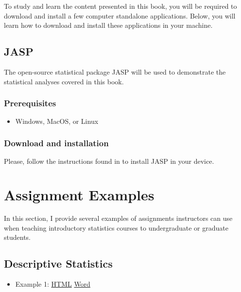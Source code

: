 \documentclass[
]{book}
\providecommand{\tightlist}{%
  \setlength{\itemsep}{0pt}\setlength{\parskip}{0pt}}
\begin{document}
To study and learn the content presented in this book, you will be required to download and install a few computer standalone applications. Below, you will learn how to download and install these applications in your machine.

\hypertarget{jasp}{%
\section{JASP}\label{jasp}}

The open-source statistical package JASP \citep{JASP2020} will be used to demonstrate the statistical analyses covered in this book.

\hypertarget{prerequisites}{%
\subsection{Prerequisites}\label{prerequisites}}

\begin{itemize}
\tightlist
\item
  Windows, MacOS, or Linux
\end{itemize}

\hypertarget{jasp-install}{%
\subsection{Download and installation}\label{jasp-install}}

Please, follow the instructions found in \citep{goss-sampsonStatisticalAnalysisJASP2020} to install JASP in your device.

\hypertarget{assignment-examples}{%
\chapter{Assignment Examples}\label{assignment-examples}}

In this section, I provide several examples of assignments instructors can use when teaching introductory statistics courses to undergraduate or graduate students.

\hypertarget{descriptive-statistics}{%
\section{Descriptive Statistics}\label{descriptive-statistics}}

\begin{itemize}
\tightlist
\item
  Example 1: \href{assignments/homework-example-01.html}{HTML} \textbar{} \href{assignments/homework-example-01.docx}{Word}
\end{itemize}
\end{document}
